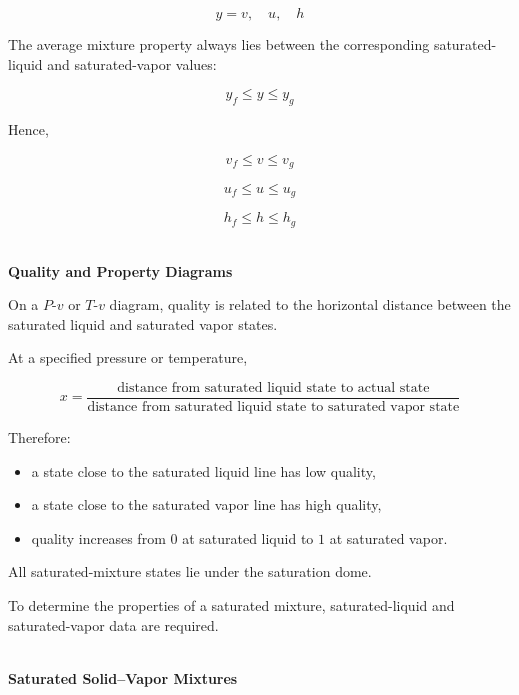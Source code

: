 \documentclass[12pt]{article}
\begin{document}
\begin{equation*}
y=v,\quad u,\quad h
\end{equation*}

The average mixture property always lies between the corresponding saturated-liquid and saturated-vapor values:

\begin{equation*}
\boxed{y_f\leq y\leq y_g}
\end{equation*}

Hence,

\begin{equation*}
v_f\leq v\leq v_g
\end{equation*}

\begin{equation*}
u_f\leq u\leq u_g
\end{equation*}

\begin{equation*}
h_f\leq h\leq h_g
\end{equation*}

\textbf{\\ Quality and Property Diagrams}

On a $P$-$v$ or $T$-$v$ diagram, quality is related to the horizontal distance between the saturated liquid and saturated vapor states.

At a specified pressure or temperature,

\begin{equation*}
\boxed{
x=
\frac{\text{distance from saturated liquid state to actual state}}
{\text{distance from saturated liquid state to saturated vapor state}}
}
\end{equation*}

Therefore:
\begin{itemize}
    \item a state close to the saturated liquid line has low quality,
    \item a state close to the saturated vapor line has high quality,
    \item quality increases from $0$ at saturated liquid to $1$ at saturated vapor.
\end{itemize}

All saturated-mixture states lie under the saturation dome.

To determine the properties of a saturated mixture, saturated-liquid and saturated-vapor data are required.

\textbf{\\ Saturated Solid--Vapor Mixtures}
\end{document}
